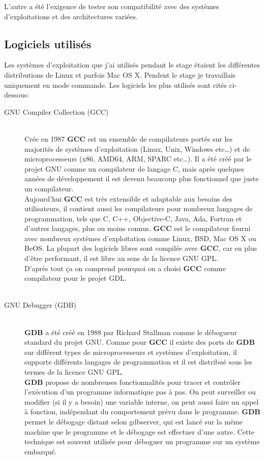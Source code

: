 L'autre a été l'exigence de tester son compatibilité avec des systèmes d'exploitations et des architectures variées.

\subsection{Logiciels utilisés}
Les systèmes d'exploitation que j'ai utilisés pendant le stage étaient les différentes distributions de Linux et parfois Mac OS X. Pendent le stage je travaillais uniquement en mode commande. Les logiciels les plus utilisés sont cités ci-dessous:


\begin{description}
  \item[GNU Compiler Collection (GCC)] \hfill \\
	Crée en 1987 \textbf{GCC} est un ensemble de compilateurs portés sur les majorités de systèmes d'exploitation (Linux, Unix, Windows etc\ldots) et de microprocesseurs (x86, AMD64, ARM, SPARC etc\ldots). Il a été créé par le projet GNU comme un compilateur de langage C, mais après quelques années de développement il est devenu beaucoup plus fonctionnel que juste un compilateur.\\
	Aujourd'hui \textbf{GCC} est très extensible et adaptable aux besoins des utilisateurs, il contient aussi les compilateurs pour nombreux langages de programmation, tels que C, C++, Objective-C, Java, Ada, Fortran et d'autres langages, plus ou moins connus. \textbf{GCC} est le compilateur fourni avec nombreux systèmes d'exploitation comme Linux, BSD, Mac OS X ou BeOS. La plupart des logiciels libres sont compilée avec \textbf{GCC}, car en plus d’être performant, il est libre au sens de la licence GNU GPL.\\
	D’après tout ça on comprend pourquoi on a choisi \textbf{GCC} comme compilateur pour le projet GDL.
	\\ \\
  \item[GNU Debugger (GDB)] \hfill \\
  \textbf{GDB} a été créé en 1988  par Richard Stallman comme le débogueur standard du projet GNU. Comme pour  \textbf{GCC} il existe des ports de \textbf{GDB}  sur différent types de microprocesseurs et systèmes d'exploitation, il supporte différents langages de programmation et il est distribué sous les termes de la licence GNU GPL.\\
  \textbf{GDB} propose de nombreuses fonctionnalités pour tracer et contrôler l’exécution d'un programme informatique pas à pas. On peut surveiller ou modifier (si il y a besoin) une variable interne, on peut aussi faire un appel à fonction, indépendant du comportement prévu dans le programme. \textbf{GDB}  permet le débogage distant selon gdbserver, qui est lancé sur la même machine que le programme et le débogage est effectuer d'une autre. Cette technique est souvent utilisée pour déboguer un programme sur un système embarqué.

\end{description}
